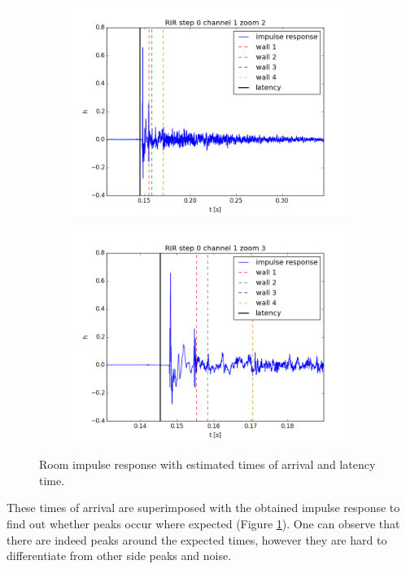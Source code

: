\begin{figure}[htb]
	\centering		
	\begin{subfigure}[b]{0.49\linewidth}
        \centering
		\includegraphics[width=\linewidth]{files/0_1_RIR_zoom2.png}
	\end{subfigure} 
	\begin{subfigure}[b]{0.49\linewidth}
        \centering
		\includegraphics[width=\linewidth]{files/0_1_RIR_zoom3.png}
	\end{subfigure}
	\caption{Room impulse response with estimated times of arrival and latency time.} 
	\label{fig:RIR_zooms}
\end{figure}

These times of arrival are superimposed with the obtained impulse response to find out whether peaks occur where expected (Figure \ref{fig:RIR_zooms}).
One can observe that there are indeed peaks around the expected times, however they are hard to differentiate from other side peaks and noise.

